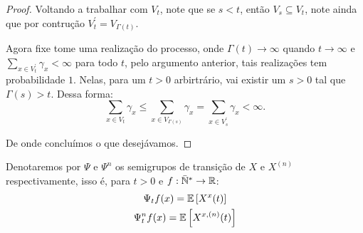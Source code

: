 \begin{proof}
  Voltando a trabalhar com $V_t$, note que se $s < t$, então $V_s
  \subseteq V_t$, note ainda que por contrução $V^\prime_t =
  V_{\Gamma(t)}$.

  Agora fixe tome uma realização do processo, onde $\Gamma(t) \to
  \infty$ quando $t \to \infty$ e $\sum_{x \in V^\prime_t} \gamma_x <
  \infty$ para todo $t$, pelo argumento anterior, tais realizações tem
  probabilidade $1$. Nelas, para um $t > 0$ arbirtrário, vai existir
  um $s > 0$ tal que $\Gamma(s) > t$. Dessa forma:
  \begin{displaymath}
    \sum_{x \in V_t} \gamma_x \leq \sum_{x \in V_{\Gamma(s)}}
    \gamma_x =
    \sum_{x \in V^\prime_s} \gamma_x < \infty.
  \end{displaymath}

  De onde concluímos o que desejávamos.
\end{proof}


\begin{definicao}
  \label{def:semigrupo}
  Denotaremos por $\Psi$ e $\Psi^n$ os semigrupos de transição de $X$
  e $X^{(n)}$ respectivamente, isso é, para $t > 0$ e $f: {\mathbb{\bar{N}^*}} \to
  {\mathbb{R}}$:
  \begin{gather*}
    \Psi_t f (x) = {\mathbb{E}} \left[ X^x(t) \right]\\
    \Psi^n_t f (x) = {\mathbb{E}} \left[ X^{x, (n)}(t) \right]
  \end{gather*}
\end{definicao}




